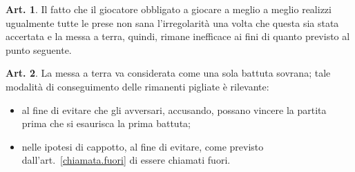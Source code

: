 \documentclass[italian,a4paper]{book}
\theoremstyle{definition}
\newtheorem{art}{Art.}
\newenvironment{packeditem}{
\begin{itemize}
  \setlength{\itemsep}{1pt}
  \setlength{\parskip}{0pt}
  \setlength{\parsep}{0pt}
}{\end{itemize}}
\begin{document}
\begin{art}
Il fatto che il giocatore obbligato a giocare a meglio a meglio realizzi ugualmente tutte le prese non sana l'irregolarità una volta che questa sia stata accertata e la messa a terra, quindi, rimane inefficace ai fini di quanto previsto al punto seguente.
\end{art}
\begin{art}\label{fine.terra}
La messa a terra va considerata come una sola battuta sovrana; tale modalità di conseguimento delle rimanenti pigliate è rilevante:
\begin{packeditem}
\item     al fine di evitare che gli avversari, accusando, possano vincere la partita prima che si esaurisca la prima battuta;
\item    nelle ipotesi di cappotto, al fine di evitare, come previsto
    dall'art.~\ref{chiamata.fuori} di essere chiamati fuori.
    \end{packeditem}
\end{art}
\end{document}
